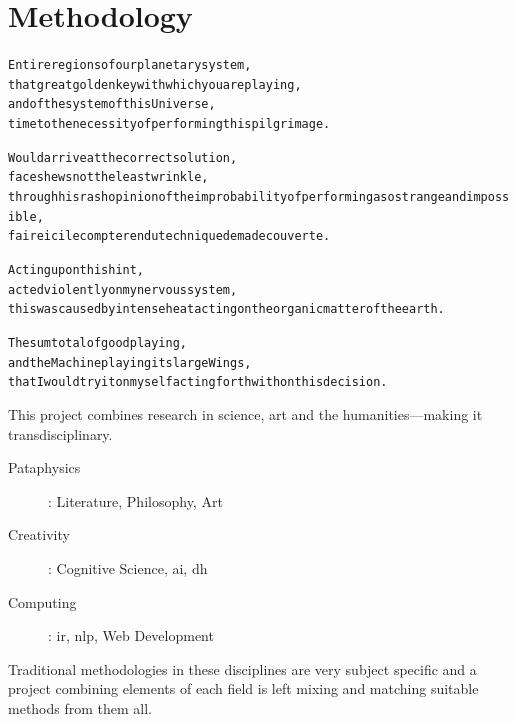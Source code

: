 
\chapter{Methodology}
\label{ch:methodology}

\startcontents[chapters]

\vfill

\begin{alltt}\sffamily
Entire regions of our planetary system,
that great golden key with which you are playing,
and of the system of this Universe,
time to the necessity of performing this pilgrimage.

Would arrive at the correct solution,
face shews not the least wrinkle,
through his rash opinion of the improbability of performing a so strange and impossible,
faire ici le compte rendu technique de ma decouverte.

Acting upon this hint,
acted violently on my nervous system,
this was caused by intense heat acting on the organic matter of the earth.

The sum total of good playing,
and the Machine playing its large Wings,
that I would try it on myself acting forthwith on this decision.
\end{alltt}

\newpage
\minicontents
\spirals



This project combines research in science, art and the humanities---making it transdisciplinary.

\begin{description}
  \item [Pataphysics]: Literature, Philosophy, Art
  \item [Creativity]: Cognitive Science, \gls{ai}, \gls{dh}
  \item [Computing]: \gls{ir}, \gls{nlp}, Web Development
\end{description}


Traditional methodologies in these disciplines are very subject specific and a project combining elements of each field is left mixing and matching suitable methods from them all.

